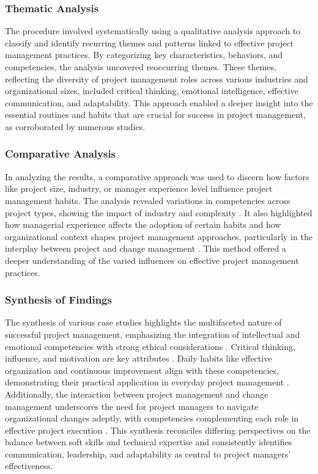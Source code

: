 \documentclass{article}
\begin{document}
\subsubsection{Thematic Analysis}

The procedure involved systematically using a qualitative analysis approach to classify and identify recurring themes and patterns linked to effective project management practices. By categorizing key characteristics, behaviors, and competencies, the analysis uncovered reoccurring themes. These themes, reflecting the diversity of project management roles across various industries and organizational sizes, included critical thinking, emotional intelligence, effective communication, and adaptability. This approach enabled a deeper insight into the essential routines and habits that are crucial for success in project management, as corroborated by numerous studies.


\subsubsection{Comparative Analysis}

In analyzing the results, a comparative approach was used to discern how factors like project size, industry, or manager experience level influence project management habits. The analysis revealed variations in competencies across project types, showing the impact of industry and complexity \cite{muller2010leadership}. It also highlighted how managerial experience affects the adoption of certain habits \cite{sigurdhssonpatterns} and how organizational context shapes project management approaches, particularly in the interplay between project and change management \cite{pollack2016project}. This method offered a deeper understanding of the varied influences on effective project management practices.

\subsubsection{Synthesis of Findings}

The synthesis of various case studies highlights the multifaceted nature of successful project management, emphasizing the integration of intellectual and emotional competencies with strong ethical considerations \cite{bredillet2015good}. Critical thinking, influence, and motivation are key attributes \cite{muller2010leadership}. Daily habits like effective organization and continuous improvement align with these competencies, demonstrating their practical application in everyday project management \cite{sigurdhssonpatterns}. Additionally, the interaction between project management and change management underscores the need for project managers to navigate organizational changes adeptly, with competencies complementing each role in effective project execution \cite{pollack2016project}. This synthesis reconciles differing perspectives on the balance between soft skills and technical expertise and consistently identifies communication, leadership, and adaptability as central to project managers' effectiveness.
\end{document}
